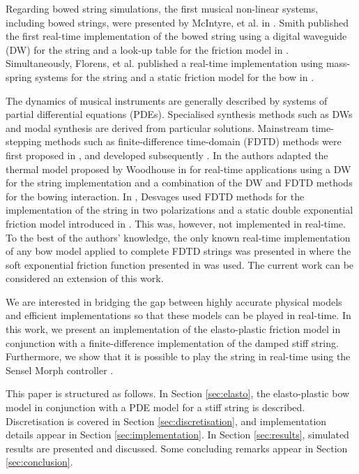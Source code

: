 \documentclass[twoside,a4paper,dvipsnames]{article}
\begin{document}
Regarding bowed string simulations, the first musical non-linear systems, including bowed strings, were presented by McIntyre, et al. in \cite{McIntyre1983}. Smith published the first real-time implementation of the bowed string using a digital waveguide (DW) for the string and a look-up table for the friction model in \cite{Smith1986}. Simultaneously, Florens, et al. published a real-time implementation using mass-spring systems for the string and a static friction model for the bow in \cite{Florens1986}. 

The dynamics of musical instruments are generally described by systems of  partial differential equations (PDEs). Specialised synthesis methods such as DWs \cite{Smith1992} and modal synthesis \cite{Morrison1993} are derived from particular solutions.  Mainstream time-stepping methods such as finite-difference time-domain (FDTD) methods were first proposed in \cite{Hiller, Hiller2, Chaigne}, and developed subsequently \cite{Bilbao2009, Bilbao2018}. In \cite{Maestre2014} the authors adapted the thermal model proposed by Woodhouse in \cite{Woodhouse2003} for real-time applications using a DW for the string implementation and a combination of the DW and FDTD methods for the bowing interaction. In \cite{Desvages2017, Desvages2015}, Desvages used FDTD methods for the implementation of the string in two polarizations and a static double exponential friction model introduced in \cite{Smith2000}. This was, however, not implemented in real-time. To the best of the authors' knowledge, the only known real-time implementation of any bow model applied to complete FDTD strings was presented in \cite{Willemsen2019} where the soft exponential friction function presented in \cite{Bilbao2009} was used. The current work can be considered an extension of this work.

We are interested in bridging the gap between highly accurate physical models and efficient implementations so that these models can be played in real-time. In this work, we present an implementation of the elasto-plastic friction model in conjunction with a finite-difference implementation of the damped stiff string. Furthermore, we show that it is possible to play the string in real-time using the Sensel Morph controller \cite{Sensel2019}.

This paper is structured as follows. In Section \ref{sec:elasto}, the elasto-plastic bow model in conjunction with a PDE model for a stiff string is described. Discretisation is covered in Section \ref{sec:discretisation}, and implementation details appear in Section \ref{sec:implementation}. In Section \ref{sec:results}, simulated results are presented and discussed. Some concluding remarks appear in Section  \ref{sec:conclusion}.
\end{document}
